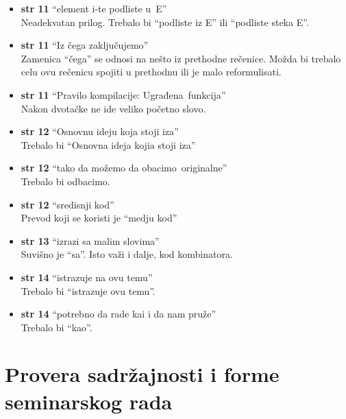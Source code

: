 \documentclass[a4paper]{report}
\begin{document}
\begin{itemize}
\item \textbf{str 11} ``element i-te podliste \color{blue}u\color{black}~E'' \\ Neadekvatan prilog. Trebalo bi ``podliste iz E'' ili ``podliste steka E''.
\item \textbf{str 11} ``Iz čega zaključujemo'' \\ Zamenica ``čega'' se odnosi na nešto iz prethodne rečenice. Možda bi trebalo celu ovu rečenicu spojiti u prethodnu ili je malo reformulisati.
\item \textbf{str 11} ``Pravilo kompilacije: \color{blue}Ugrađena\color{black}~funkcija'' \\ Nakon dvotačke ne ide veliko početno slovo.
\item \textbf{str 12} ``Osnovnu ideju koja stoji iza'' \\ Trebalo bi ``Osnovna ideja kojia stoji iza''
\item \textbf{str 12} ``tako da možemo da \color{blue}obacimo\color{black}~originalne'' \\ Trebalo bi \color{blue}odbacimo\color{black}.
\item \textbf{str 12} ``sredisnji kod'' \\ Prevod koji se koristi je ``medju kod''
\item \textbf{str 13} ``izrazi \color{blue}sa\color{black} malim slovima'' \\ Suvišno je ``sa''. Isto važi i dalje, kod kombinatora.
\item \textbf{str 14} ``istrazuje na ovu temu'' \\ Trebalo bi ``istrazuje ovu temu''.
\item \textbf{str 14} ``potrebno da rade \color{blue}kai\color{black} i da nam pruže'' \\ Trebalo bi ``kao''.

\end{itemize}

\section{Provera sadržajnosti i forme seminarskog rada}
\end{document}
